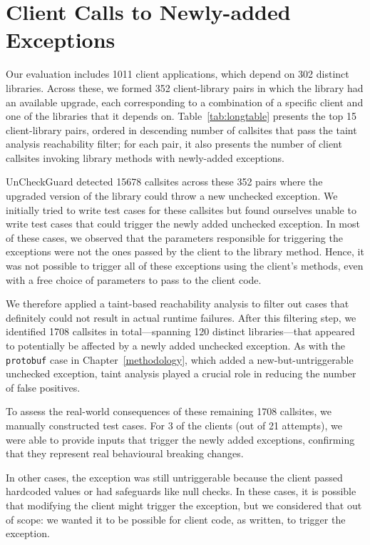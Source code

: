 \section{Client Calls to Newly-added Exceptions}

Our evaluation includes 1011 client applications, which depend on 302 distinct libraries. Across these, we formed 352 client-library pairs in which the library had an available upgrade, each corresponding to a combination of a specific client and one of the libraries that it depends on. Table~\ref{tab:longtable} presents the top 15 client-library pairs, ordered in descending number of callsites that pass the taint analysis reachability filter; for each pair, it also presents the number of client callsites invoking library methods with newly-added exceptions.

UnCheckGuard detected 15678 callsites across these 352 pairs where the upgraded version of the library could throw a new unchecked exception.
We initially tried to write test cases for these callsites but found ourselves unable to write test cases that could trigger
the newly added unchecked exception. In most of these cases, we observed that the parameters responsible for triggering the 
exceptions were not the ones passed by the client to the library method.
Hence, it was not possible to trigger all of these exceptions using the client's methods, even with a free choice of parameters to pass to the client code.

We therefore applied a taint-based reachability analysis to filter out cases that definitely could not result in actual runtime failures. After this filtering step, we identified 1708 callsites in total—spanning 120 distinct libraries—that appeared to potentially be affected by a newly added unchecked exception.
As with the \texttt{protobuf} case in Chapter~\ref{methodology}, which added a new-but-untriggerable unchecked exception, taint analysis played a crucial role in reducing the number of false positives.

To assess the real-world consequences of these remaining 1708 callsites, we manually constructed test cases. For 3 of the clients (out of 21 attempts), we were able to provide inputs that trigger the newly added exceptions, confirming that they represent real behavioural breaking changes.

In other cases, the exception was still untriggerable because the client passed hardcoded values or had safeguards like null checks. In these cases, it is possible that modifying the client might trigger the exception, but we considered that out of scope: we wanted it to be possible for client code, as written, to trigger the exception.

